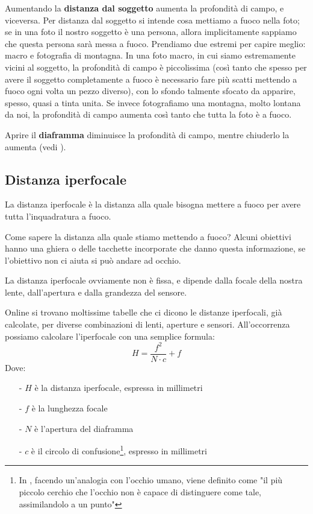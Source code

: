Aumentando la \textbf{distanza dal soggetto} aumenta la profondità di campo, e viceversa.\newline
Per distanza dal soggetto si intende cosa mettiamo a fuoco nella foto; se in una foto il nostro soggetto è una persona, allora implicitamente sappiamo che questa persona sarà messa a fuoco.
Prendiamo due estremi per capire meglio: macro e fotografia di montagna. In una foto macro, in cui siamo estremamente vicini al soggetto, la profondità di campo è piccolissima (così tanto che spesso per avere il soggetto completamente a fuoco è necessario fare più scatti mettendo a fuoco ogni volta un pezzo diverso), con lo sfondo talmente sfocato da apparire, spesso, quasi a tinta unita. Se invece fotografiamo una montagna, molto lontana da noi, la profondità di campo aumenta così tanto che tutta la foto è a fuoco.

Aprire il \textbf{diaframma} diminuisce la profondità di campo, mentre chiuderlo la aumenta (vedi ).


\subsection{Distanza iperfocale} \label{subsec:iperfocale}
La distanza iperfocale è la distanza alla quale bisogna mettere a fuoco per avere tutta l'inquadratura a fuoco.

Come sapere la distanza alla quale stiamo mettendo a fuoco? Alcuni obiettivi hanno una ghiera o delle tacchette incorporate che danno questa informazione, se l'obiettivo non ci aiuta si può andare ad occhio.

La distanza iperfocale ovviamente non è fissa, e dipende dalla focale della nostra lente, dall'apertura e dalla grandezza del sensore.

Online si trovano moltissime tabelle che ci dicono le distanze iperfocali, già calcolate, per diverse combinazioni di lenti, aperture e sensori. All'occorrenza possiamo calcolare l'iperfocale con una semplice formula:
\begin{equation}\label{eq:iperfocale}
    H = \dfrac{f^2}{N \cdot c} + f
\end{equation}
Dove:
\begin{itemize}
    \item[-] $H$ è la distanza iperfocale, espressa in millimetri
    \item[-] $f$ è la lunghezza focale
    \item[-] $N$ è l'apertura del diaframma
    \item[-] $c$ è il circolo di confusione\footnote{
        In \cite{Fodde2020-xh}, facendo un'analogia con l'occhio umano, viene definito come "il più piccolo cerchio che l'occhio non è capace di distinguere come tale, assimilandolo a un punto"
    }, espresso in millimetri
\end{itemize}

